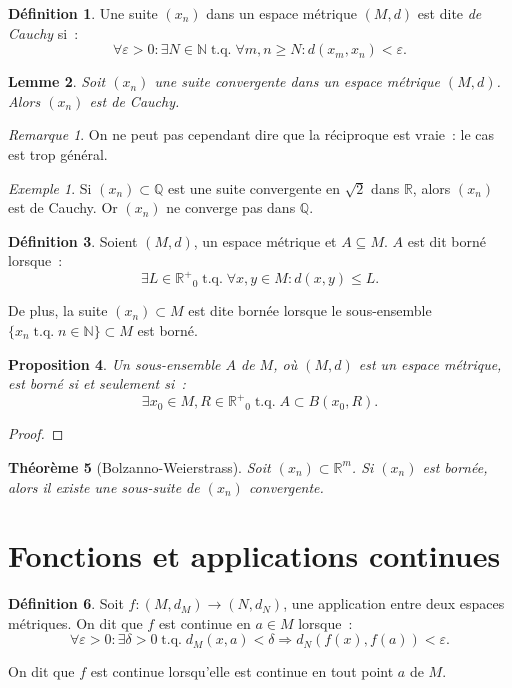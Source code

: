\documentclass{report}
\newtheorem{thm}{Théorème}[chapter]
\newtheorem{prp}[thm]{Proposition}
\newtheorem{lem}[thm]{Lemme}
\theoremstyle{definition}
\newtheorem{déf}[thm]{Définition}
\theoremstyle{remark}
\newtheorem*{rmq}{Remarque}
\newtheorem{ex}{Exemple}[chapter]
\DeclareMathOperator{\tq}{\text{ t.q. }}
\newcommand{\R}{\mathbb R}
\newcommand{\Rp}{{\R^+}}
\newcommand{\Q}{\mathbb Q}
\newcommand{\N}{\mathbb N}
\begin{document}
		\begin{déf} Une suite $(x_n)$ dans un espace métrique $(M, d)$ est dite \textit{de Cauchy} si~:
		\[\forall \varepsilon > 0 : \exists N \in \N \tq \forall m, n \geq N : d(x_m, x_n) < \varepsilon.\]
		\end{déf}

		\begin{lem} Soit $(x_n)$ une suite convergente dans un espace métrique $(M, d)$. Alors $(x_n)$ est de Cauchy. \end{lem}

		\begin{rmq} On ne peut pas cependant dire que la réciproque est vraie~: le cas est trop général. \end{rmq}

		\begin{ex} Si $(x_n) \subset \Q$ est une suite convergente en $\sqrt 2$ dans $\R$, alors $(x_n)$ est de Cauchy. Or $(x_n)$ ne converge pas dans $\Q$.
		\end{ex}

		\begin{déf} Soient $(M, d)$, un espace métrique et $A \subseteq M$. $A$ est dit borné lorsque~:
		\[\exists L \in \Rp_0 \tq \forall x, y \in M : d(x, y) \leq L.\]

		De plus, la suite $(x_n) \subset M$ est dite bornée lorsque le sous-ensemble $\{x_n \tq n \in \N\} \subset M$ est borné.
		\end{déf}

		\begin{prp} Un sous-ensemble $A$ de $M$, où $(M, d)$ est un espace métrique, est borné si et seulement si~:
		\[\exists x_0 \in M, R \in \Rp_0 \tq A \subset B(x_0, R).\]
		\end{prp}

		\begin{proof}  %
		\end{proof}

		\begin{thm}[Bolzanno-Weierstrass] Soit $(x_n) \subset \R^m$. Si $(x_n)$ est bornée, alors il existe une sous-suite de $(x_n)$ convergente.
		\end{thm}

	\section{Fonctions et applications continues}
		\begin{déf} Soit $f : (M, d_M) \to (N, d_N)$, une application entre deux espaces métriques. On dit que $f$ est continue en $a \in M$ lorsque~:
		\[\forall \varepsilon > 0 : \exists \delta > 0 \tq d_M(x, a) < \delta \Rightarrow d_N(f(x), f(a)) < \varepsilon.\]

		On dit que $f$ est continue lorsqu'elle est continue en tout point $a$ de $M$.
		\end{déf}
\end{document}
